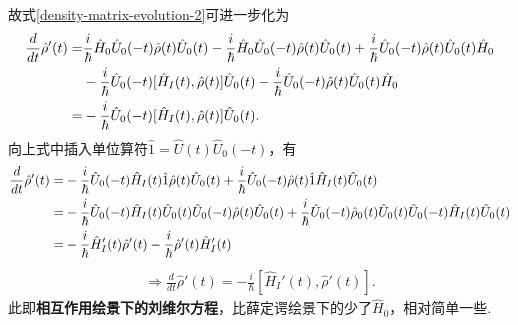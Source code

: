 \documentclass{assignment}
\begin{document}
故式\eqref{density-matrix-evolution-2}可进一步化为
\begin{align}
    \notag\frac{d}{dt}\hat{\rho}'(t)=&\frac{i}{\hbar}\hat{H}_0\hat{U}_0(-t)\hat{\rho}(t)\hat{U}_0(t)-\frac{i}{\hbar}\hat{H}_0\hat{U}_0(-t)\hat{\rho}(t)\hat{U}_0(t)+\frac{i}{\hbar}\hat{U}_0(-t)\hat{\rho}(t)\hat{U}_0(t)\hat{H}_0\\
    \notag&-\frac{i}{\hbar}\hat{U}_0(-t)[\hat{H}_I(t),\hat{\rho}(t)]\hat{U}_0(t)-\frac{i}{\hbar}\hat{U}_0(-t)\hat{\rho}(t)\hat{U}_0(t)\hat{H}_0\\
    =&-\frac{i}{\hbar}\hat{U}_0(-t)[\hat{H}_I(t),\hat{\rho}(t)]\hat{U}_0(t).
\end{align}
向上式中插入单位算符$\hat{1}=\hat{U}(t)\hat{U}_0(-t)$，有
\begin{align}
    \notag\frac{d}{dt}\hat{\rho}'(t)=&-\frac{i}{\hbar}\hat{U}_0(-t)\hat{H}_I(t)\hat{1}\hat{\rho}(t)\hat{U}_0(t)+\frac{i}{\hbar}\hat{U}_0(-t)\hat{\rho}(t)\hat{1}\hat{H}_I(t)\hat{U}_0(t)\\
    \notag=&-\frac{i}{\hbar}\hat{U}_0(-t)\hat{H}_I(t)\hat{U}_0(t)\hat{U}_0(-t)\hat{\rho}(t)\hat{U}_0(t)+\frac{i}{\hbar}\hat{U}_0(-t)\hat{\rho}_0(t)\hat{U}_0(t)\hat{U}_0(-t)\hat{H}_I(t)\hat{U}_0(t)\\
    \notag=&-\frac{i}{\hbar}\hat{H}_I'(t)\hat{\rho}'(t)-\frac{i}{\hbar}\hat{\rho}'(t)\hat{H}_I'(t)
\end{align}
\begin{align}
    \label{Liouville-equ-2}
    \Longrightarrow\boxed{\frac{d}{dt}\hat{\rho}'(t)=-\frac{i}{\hbar}[\hat{H}_I'(t),\hat{\rho}'(t)]}.
\end{align}
此即\textbf{相互作用绘景下的刘维尔方程}，比薛定谔绘景下的少了$\hat{H}_0$，相对简单一些.
\end{document}
